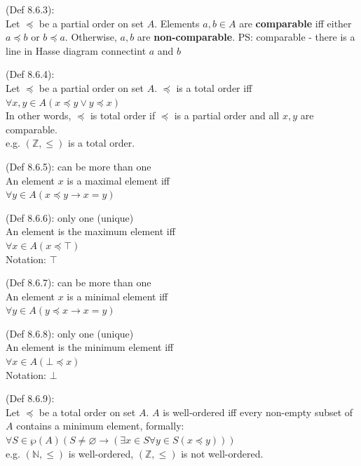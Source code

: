 \documentclass[10pt,landscape,a4paper]{article}
\newenvironment{descitemize} %
{\begin{description}[leftmargin=*,before=\let\makelabel\descitemlabel]}
{\end{description}}
\newcommand{\descitemlabel}[1]{%
\textbullet\ \textbf{#1}%
}
\begin{document}
\begin{multicols*}{4}
\begin{descitemize}
    \item [Comparable] (Def 8.6.3):\\
    Let $\preceq$ be a partial order on set $A$. Elements $a,b\in A$ are \textbf{comparable} iff either $a\preceq b$ or $b\preceq a$. Otherwise, $a,b$ are \textbf{non-comparable}.
    PS: comparable - there is a line in Hasse diagram connectint $a$ and $b$

    \item [Total order (or linear order)] (Def 8.6.4):\\
    Let $\preceq$ be a partial order on set $A$. $\preceq$ is a total order iff $\forall x,y\in A (x\preceq y \lor y\preceq x)$\\
    In other words, $\preceq$ is total order if $\preceq$ is a partial order and all $x,y$ are comparable.\\
    e.g. $(\mathbb{Z},\leq)$ is a total order.

    \item [Maximal] (Def 8.6.5): can be more than one\\
    An element $x$ is a maximal element iff\\
    $\forall y \in A (x\preceq y \rightarrow x=y)$

    \item [Maximum] (Def 8.6.6): only one (unique)\\
    An element is the maximum element iff\\
    $\forall x \in A(x \preceq \top)$\\
    Notation: $\top$

    \item [Minimal] (Def 8.6.7): can be more than one\\
    An element $x$ is a minimal element iff\\
    $\forall y \in A(y\preceq x \rightarrow x=y)$

    \item [Minimum] (Def 8.6.8): only one (unique)\\
    An element is the minimum element iff\\
    $\forall x\in A(\bot \preceq x)$\\
    Notation: $\bot$

    \item [Well-ordering of Total Orders] (Def 8.6.9):\\
    Let $\preceq$ be a total order on set $A$. $A$ is well-ordered iff every non-empty subset of $A$ contains a minimum element, formally:\\
    $\forall S \in \wp(A) (S\neq \varnothing \rightarrow(\exists x\in S \forall y \in S (x \preceq y)))$\\
    e.g. $(\mathbb{N}, \leq)$ is well-ordered, $(\mathbb{Z}, \leq)$ is not well-ordered.


\end{descitemize}
\end{multicols*}
\end{document}
